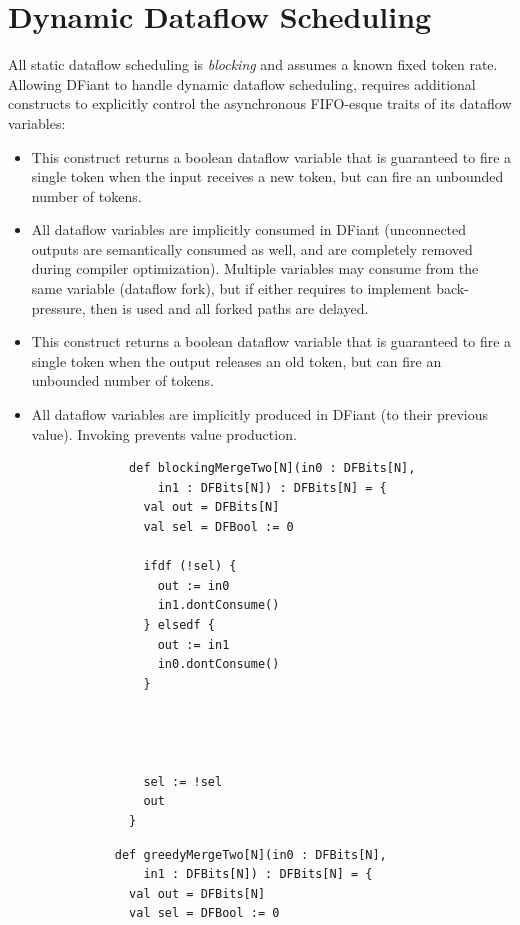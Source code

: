 \section{Dynamic Dataflow Scheduling}
All static dataflow scheduling is \textit{blocking} and assumes a known fixed token rate. Allowing DFiant to handle dynamic dataflow scheduling, requires additional constructs to explicitly control the asynchronous FIFO-esque traits of its dataflow variables:
\begin{itemize}
  \item {}\quad This construct returns a boolean dataflow variable that is guaranteed to fire a single  token when the input receives a new token, but can fire an unbounded number of  tokens.
  \item {}\quad All dataflow variables are implicitly consumed in DFiant (unconnected outputs are semantically consumed as well, and are completely removed during compiler optimization). Multiple variables may consume from the same variable (dataflow fork), but if either requires to implement back-pressure, then  is used and all forked paths are delayed.
  \item {}\quad This construct returns a boolean dataflow variable that is guaranteed to fire a single  token when the output releases an old token, but can fire an unbounded number of  tokens.
  \item {}\quad All dataflow variables are implicitly produced in DFiant (to their previous value). Invoking  prevents value production. 

  \begin{figure}[H]
    \centering
    \begin{minipage}{0.49\linewidth}
      \begin{verbatim}
        def blockingMergeTwo[N](in0 : DFBits[N],
            in1 : DFBits[N]) : DFBits[N] = {
          val out = DFBits[N]
          val sel = DFBool := 0
        
          ifdf (!sel) {
            out := in0
            in1.dontConsume()
          } elsedf {
            out := in1
            in0.dontConsume()
          }
          
          
          
          
          sel := !sel
          out
        }
      \end{verbatim}
    \label{fig:BlockingRR}
   \end{minipage}%
   \hfill
   \begin{minipage}{0.49\linewidth}
      \begin{verbatim}
      def greedyMergeTwo[N](in0 : DFBits[N], 
          in1 : DFBits[N]) : DFBits[N] = {
        val out = DFBits[N]
        val sel = DFBool := 0
        

\end{verbatim}
\end{minipage}
\end{figure}
\end{itemize}
